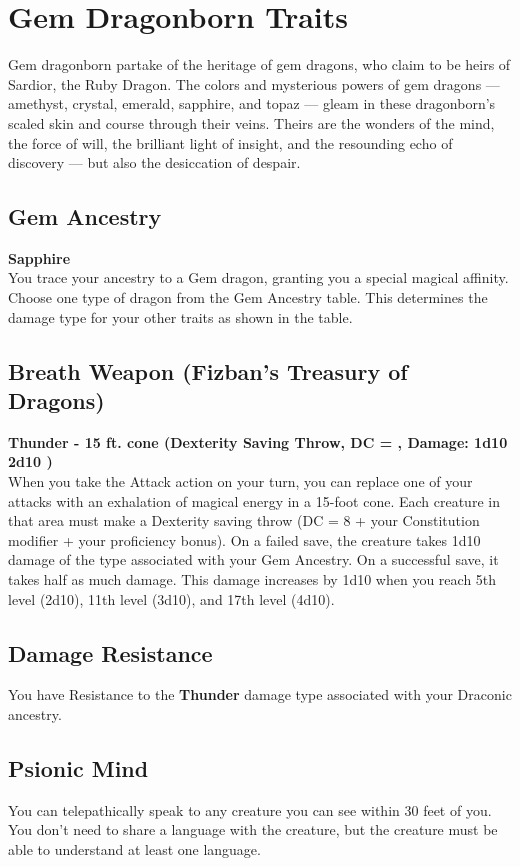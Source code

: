 \documentclass[letterpaper,openany,oneside,twocolumn]{book}
\def\BreathWeaponDamage{\ifthenelse{\LevelValue < 5}%
	{1d10}%
	{%
		\ifthenelse{\LevelValue < 11}%
		{2d10}%
		{%
			\ifthenelse{\LevelValue < 17}{3d10}{4d10}%
		}%
	}%
}
\begin{document}
\section*{Gem Dragonborn Traits}
Gem dragonborn partake of the heritage of gem dragons, who claim to be heirs of Sardior, the Ruby Dragon. The colors and mysterious powers of gem dragons — amethyst, crystal, emerald, sapphire, and topaz — gleam in these dragonborn's scaled skin and course through their veins. Theirs are the wonders of the mind, the force of will, the brilliant light of insight, and the resounding echo of discovery — but also the desiccation of despair.
\subsection*{Gem Ancestry}
\textbf{Sapphire} \\
You trace your ancestry to a Gem dragon, granting you a special magical affinity. Choose one type of dragon from the Gem Ancestry table. This determines the damage type for your other traits as shown in the table.
\subsection*{Breath Weapon (Fizban's Treasury of Dragons)}
\textbf{Thunder - 15 ft. cone (Dexterity Saving Throw, DC = , Damage: \BreathWeaponDamage )} \\
When you take the Attack action on your turn, you can replace one of your attacks with an exhalation of magical energy in a 15-foot cone. Each creature in that area must make a Dexterity saving throw (DC = 8 + your Constitution modifier + your proficiency bonus). On a failed save, the creature takes 1d10 damage of the type associated with your Gem Ancestry. On a successful save, it takes half as much damage. This damage increases by 1d10 when you reach 5th level (2d10), 11th level (3d10), and 17th level (4d10).
\subsection*{Damage Resistance}
You have Resistance to the \textbf{Thunder} damage type associated with your Draconic ancestry.
\subsection*{Psionic Mind}
You can telepathically speak to any creature you can see within 30 feet of you. You don't need to share a language with the creature, but the creature must be able to understand at least one language.
\end{document}

